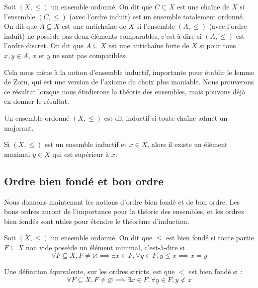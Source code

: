 \begin{definition}
  Soit $(X,\leq)$ un ensemble ordonné. On dit que $C\subseteq X$ est une chaîne
  de $X$ si l'ensemble $(C,\leq)$ (avec l'ordre induit) est un ensemble
  totalement ordonné. On dit que $A\subseteq X$ est une antichaîne de $X$ si
  l'ensemble $(A,\leq)$ (avec l'ordre induit) ne possède pas deux éléments
  comparables, c'est-à-dire si $(A,\leq)$ est l'ordre discret. On dit que
  $A\subseteq X$ est une antichaîne forte de $X$ si pour tous $x,y\in A$, $x$ et
  $y$ ne sont pas compatibles.
\end{definition}

Cela nous mène à la notion d'ensemble inductif, importante pour établir le lemme
de Zorn, qui est une version de l'axiome du choix plus maniable. Nous prouverons
ce résultat lorsque nous étudierons la théorie des ensembles, mais pouvons déjà
en donner le résultat.

\begin{definition}
  Un ensemble ordonné $(X,\leq)$ est dit inductif si toute chaîne admet un
  majorant.
\end{definition}

\begin{theorem}\label{thm.Zorn}
  Si $(X,\leq)$ est un ensemble inductif et $x\in X$, alors il existe un élément
  maximal $y \in X$ qui est supérieur à $x$.
\end{theorem}

\subsection{Ordre bien fondé et bon ordre}

Nous donnons maintenant les notions d'ordre bien fondé et de bon ordre. Les bons
ordres auront de l'importance pour la théorie des ensembles, et les ordres bien
fondés sont utiles pour étendre le théorème d'induction.

\begin{definition}
  Soit $(X,\leq)$ un ensemble ordonné. On dit que $\leq$ est bien fondé si toute
  partie $F\subseteq X$ non vide possède un élément minimal, c'est-à-dire si
  \[\forall F \subseteq X, F\neq \varnothing \implies \exists x\in F,
  \forall y\in F, y\leq x \implies x = y\]
\end{definition}

\begin{remark}
  Une définition équivalente, sur les ordres stricts, est que $<$ est bien fondé
  si :
  \[\forall F \subseteq X, F\neq \varnothing \implies \exists x \in F,
  \forall y \in F, y\nless x\]
\end{remark}


